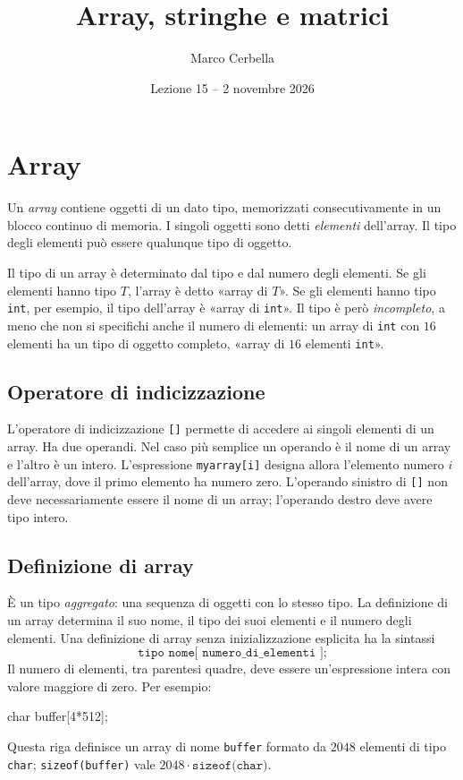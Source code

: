 \documentclass[11pt,a4paper]{article}
\title{Array, stringhe e matrici}
\author{Marco Cerbella}
\date{Lezione 15 -- 2 novembre 2026}
\begin{document}
\maketitle

\section{Array}

Un \emph{array} contiene oggetti di un dato tipo, memorizzati consecutivamente in un blocco continuo di memoria. I singoli oggetti sono detti \emph{elementi} dell'array. Il tipo degli elementi può essere qualunque tipo di oggetto.

Il tipo di un array è determinato dal tipo e dal numero degli elementi. Se gli elementi hanno tipo $T$, l'array è detto «array di $T$». Se gli elementi hanno tipo \lstinline|int|, per esempio, il tipo dell'array è «array di \lstinline|int|». Il tipo è però \emph{incompleto}, a meno che non si specifichi anche il numero di elementi: un array di \lstinline|int| con $16$ elementi ha un tipo di oggetto completo, «array di $16$ elementi \lstinline|int|».

\subsection{Operatore di indicizzazione}

L'operatore di indicizzazione \lstinline|[]| permette di accedere ai singoli elementi di un array. Ha due operandi. Nel caso più semplice un operando è il nome di un array e l'altro è un intero. L'espressione \lstinline|myarray[i]| designa allora l'elemento numero $i$ dell'array, dove il primo elemento ha numero zero. L'operando sinistro di \lstinline|[]| non deve necessariamente essere il nome di un array; l'operando destro deve avere tipo intero.

\subsection{Definizione di array}

È un tipo \emph{aggregato}: una sequenza di oggetti con lo stesso tipo. La definizione di un array determina il suo nome, il tipo dei suoi elementi e il numero degli elementi. Una definizione di array senza inizializzazione esplicita ha la sintassi
\[
\texttt{tipo nome[ numero\_di\_elementi ];}
\]
Il numero di elementi, tra parentesi quadre, deve essere un'espressione intera con valore maggiore di zero. Per esempio:
\begin{codice}
char buffer[4*512];
\end{codice}
Questa riga definisce un array di nome \lstinline|buffer| formato da $2048$ elementi di tipo \lstinline|char|; \lstinline|sizeof(buffer)| vale $2048 \cdot \texttt{sizeof(char)}$.
\end{document}
